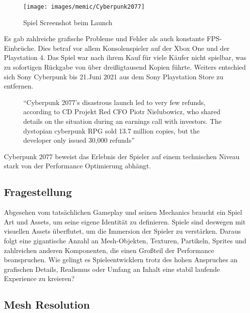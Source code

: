 \begin{figure}[H]
	\centering
	\texttt{[image: images/memic/Cyberpunk2077]}
	\caption{Spiel Screenshot beim Launch}
\end{figure}

 Es gab zahlreiche grafische Probleme und Fehler als auch konstante FPS-Einbrüche. Dies betraf vor allem Konsolenspieler auf der Xbox One und der Playstation 4. Das Spiel war nach ihrem Kauf für viele Käufer nicht spielbar, was zu sofortigen Rückgabe von über dreißigtausend Kopien führte. Weiters entschied sich Sony Cyberpunk bis 21.Juni 2021 aus dem Sony Playstation Store zu entfernen.
 
\begin{figure}[H]
		\centering
"`Cyberpunk 2077’s disastrous launch led to very few refunds, according to CD Projekt Red CFO Piotr Nielubowicz, who shared details on the situation during an earnings call with investors. The dystopian cyberpunk RPG sold 13.7 million copies, but the developer only issued 30,000 refunds"'
\end{figure}
\cite{_cyberpunk_article}

Cyberpunk 2077 beweist das Erlebnis der Spieler auf einem technischen Niveau stark von der Performance Optimierung abhängt.

\subsection{Fragestellung}

Abgesehen vom tatsächlichen Gameplay und seinen Mechanics braucht ein Spiel Art und Assets, um seine eigene Identität zu definieren. Spiele sind deswegen mit visuellen Assets überflutet, um die Immersion der Spieler zu verstärken. Daraus folgt eine gigantische Anzahl an Mesh-Objekten, Texturen, Partikeln, Sprites und zahlreichen anderen Komponenten, die einen Großteil der Performance beanspruchen. Wie gelingt es Spieleentwicklern trotz des hohen Anspruches an grafischen Details, Realismus oder Umfang an Inhalt eine stabil laufende Experience zu kreieren?

\subsection{Mesh Resolution}

